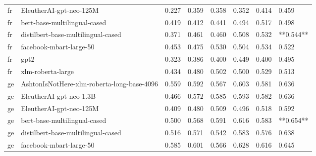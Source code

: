\begin{tabular}{llllllll}
      fr &                    EleutherAI-gpt-neo-125M & 0.227 &                     0.359 &                 0.358 &                  0.352 &                                   0.414 &     0.459 \\
      fr &               bert-base-multilingual-cased & 0.419 &                     0.412 &                 0.441 &                  0.494 &                                   0.517 &     0.498 \\
      fr &         distilbert-base-multilingual-cased & 0.371 &                     0.461 &                 0.460 &                  0.508 &                                   0.532 & **0.544** \\
      fr &                    facebook-mbart-large-50 & 0.453 &                     0.475 &                 0.530 &                  0.504 &                                   0.534 &     0.522 \\
      fr &                                       gpt2 & 0.323 &                     0.386 &                 0.400 &                  0.449 &                                   0.400 &     0.495 \\
      fr &                          xlm-roberta-large & 0.434 &                     0.480 &                 0.502 &                  0.500 &                                   0.529 &     0.513 \\
      ge & AshtonIsNotHere-xlm-roberta-long-base-4096 & 0.559 &                     0.592 &                 0.567 &                  0.603 &                                   0.581 &     0.636 \\
      ge &                    EleutherAI-gpt-neo-1.3B & 0.466 &                     0.572 &                 0.585 &                  0.593 &                                   0.582 &     0.636 \\
      ge &                    EleutherAI-gpt-neo-125M & 0.409 &                     0.480 &                 0.509 &                  0.496 &                                   0.518 &     0.592 \\
      ge &               bert-base-multilingual-cased & 0.500 &                     0.568 &                 0.591 &                  0.616 &                                   0.583 & **0.654** \\
      ge &         distilbert-base-multilingual-cased & 0.516 &                     0.571 &                 0.542 &                  0.583 &                                   0.576 &     0.638 \\
      ge &                    facebook-mbart-large-50 & 0.585 &                     0.601 &                 0.566 &                  0.628 &                                   0.616 &     0.645 \\

\end{tabular}
